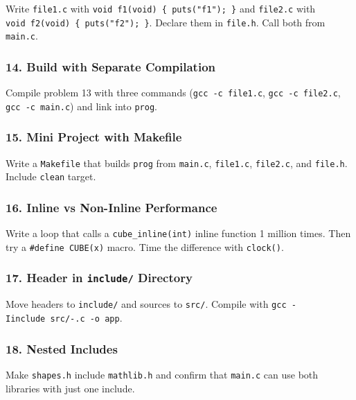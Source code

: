 \documentclass[
  letterpaper,
  DIV=11,
  numbers=noendperiod]{scrreprt}
\begin{document}
Write \texttt{file1.c} with \texttt{void\ f1(void)\ \{\ puts("f1");\ \}}
and \texttt{file2.c} with \texttt{void\ f2(void)\ \{\ puts("f2");\ \}}.
Declare them in \texttt{file.h}. Call both from \texttt{main.c}.

\subsubsection{14. Build with Separate
Compilation}\label{build-with-separate-compilation}

Compile problem 13 with three commands (\texttt{gcc\ -c\ file1.c},
\texttt{gcc\ -c\ file2.c}, \texttt{gcc\ -c\ main.c}) and link into
\texttt{prog}.

\subsubsection{15. Mini Project with
Makefile}\label{mini-project-with-makefile}

Write a \texttt{Makefile} that builds \texttt{prog} from
\texttt{main.c}, \texttt{file1.c}, \texttt{file2.c}, and
\texttt{file.h}. Include \texttt{clean} target.

\subsubsection{16. Inline vs Non-Inline
Performance}\label{inline-vs-non-inline-performance}

Write a loop that calls a \texttt{cube\_inline(int)} inline function 1
million times. Then try a \texttt{\#define\ CUBE(x)} macro. Time the
difference with \texttt{clock()}.

\subsubsection{\texorpdfstring{17. Header in \texttt{include/}
Directory}{17. Header in include/ Directory}}\label{header-in-include-directory}

Move headers to \texttt{include/} and sources to \texttt{src/}. Compile
with \texttt{gcc\ -Iinclude\ src/-.c\ -o\ app}.

\subsubsection{18. Nested Includes}\label{nested-includes}

Make \texttt{shapes.h} include \texttt{mathlib.h} and confirm that
\texttt{main.c} can use both libraries with just one include.
\end{document}
